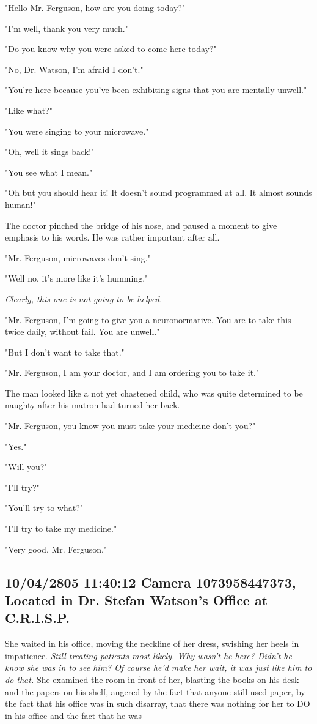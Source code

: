 \documentclass[12pt]{article}
\begin{document}
"Hello Mr. Ferguson, how are you doing today?"

"I'm well, thank you very much."

"Do you know why you were asked to come here today?"

"No, Dr. Watson, I'm afraid I don't."

"You're here because you've been exhibiting signs that you are mentally unwell."

"Like what?"

"You were singing to your microwave."

"Oh, well it sings back!"

"You see what I mean."

"Oh but you should hear it! It doesn't sound programmed at all. It almost sounds human!"

The doctor pinched the bridge of his nose, and paused a moment to give emphasis to his words. He was rather important after all.

"Mr. Ferguson, microwaves don't sing."

"Well no, it's more like it's humming."

\emph{Clearly, this one is not going to be helped.}

"Mr. Ferguson, I'm going to give you a neuronormative. You are to take this twice daily, without fail. You are unwell."

"But I don't want to take that."

"Mr. Ferguson, I am your doctor, and I am ordering you to take it."

The man looked like a not yet chastened child, who was quite determined to be naughty after his matron had turned her back.

"Mr. Ferguson, you know you must take your medicine don't you?"

"Yes."

"Will you?"

"I'll try?"

"You'll try to what?"

"I'll try to take my medicine."

"Very good, Mr. Ferguson."

\subsection*{10/04/2805 11:40:12 Camera 1073958447373, Located in Dr. Stefan Watson's Office at C.R.I.S.P.}
\label{sec:orgdcadf0a}

She waited in his office, moving the neckline of her dress, swishing her heels in impatience. \emph{Still treating patients most likely. Why wasn't he here? Didn't he know she was in to see him? Of course he'd make her wait, it was just like him to do that.} She examined the room in front of her, blasting the books on his desk and the papers on his shelf, angered by the fact that anyone still used paper, by the fact that his office was in such disarray, that there was nothing for her to DO in his office and the fact that he was
\end{document}
